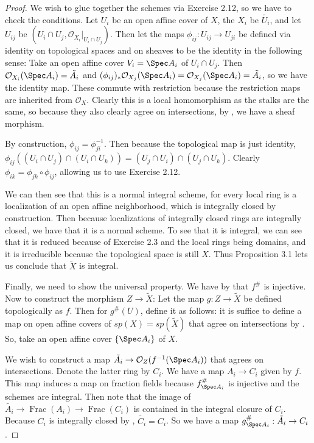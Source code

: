 \begin{proof}
	We wish to glue together the schemes via Exercise 2.12, so we have to check the conditions.
	Let $U_i $ be an open affine cover of $X $, the $X_i $ be $\tilde{U_i} $, and let $U_{ij} $ be $(U_{i}\cap U_j, \mathcal{O}_{X_i}\big|_{U_i\cap U_j})$.
	Then let the maps $\phi _{ij}: U_{ij} \to U_{ji} $ be defined via identity on topological spaces and on sheaves to be the identity in the following sense:
	Take an open affine cover $V_{i} = \Spec A_i$ of $U_{i}\cap U_{j} $.
	Then $\mathcal{O}_{X_i}(\Spec A_i) = \tilde{A_i}$ and $(\phi _{ij})_\ast \mathcal{O}_{X_j}(\Spec A_i) = \mathcal{O}_{X_j}(\Spec A_i) = \tilde{A_i}$, so we have the identity map.
	These commute with restriction because the restriction maps are inherited from $\mathcal{O}_X $.
	Clearly this is a local homomorphism as the stalks are the same, so because they also clearly agree on intersections, by , we have a sheaf morphism.

	By construction, $\phi _{ij} = \phi _{ji}^{-1} $.
	Then because the topological map is just identity, $\phi _{ij}((U_i\cap U_j)\cap (U_i\cap U_k)) = (U_j \cap U_i) \cap (U_j \cap U_k) $.
	Clearly $\phi _{ik} = \phi _{jk}\circ \phi _{ij} $, allowing us to use Exercise 2.12.

	We can then see that this is a normal integral scheme, for every local ring is a localization of an open affine neighborhood, which is integrally closed by construction.
	Then because localizations of integrally closed rings are integrally closed, we have that it is a normal scheme.
	To see that it is integral, we can see that it is reduced because of Exercise 2.3 and the local rings being domains, and it is irreducible because the topological space is still $X $.
	Thus Proposition 3.1 lets us conclude that $\tilde{X} $ is integral.

	Finally, we need to show the universal property.
	We have by  that $f^\# $ is injective.
	Now to construct the morphism $Z\to \tilde{X} $: 
	Let the map $g:Z\to \tilde{X} $ be defined topologically as $f $.
	Then for $g^\#(U) $, define it as follows: it is suffice to define a map on open affine covers of $sp(X) = sp(\tilde{X}) $ that agree on intersections by .
	So, take an open affine cover $\{\Spec A_i\}   $ of $X $.

	We wish to construct a map $\tilde{A_i} \to \mathcal{O}_Z(f^{-1}(\Spec A_i)) $ that agrees on intersections.
	Denote the latter ring by $C_i $.
	We have a map $A_i \to C_i $ given by $f $.
	This map induces a map on fraction fields because $f^\#_{\Spec A_i} $ is injective and the schemes are integral.
	Then note that the image of $\tilde{A_i} \to \operatorname{Frac}(A_i) \to \operatorname{Frac}(C_i)$ is contained in the integral closure of $C_i $.
	Because $C_i$ is integrally closed by , $\tilde{C_i} = C_i $.
	So we have a map $g^\#_{\Spec A_i}:\tilde{A_i}\to C_i $.


\end{proof}
